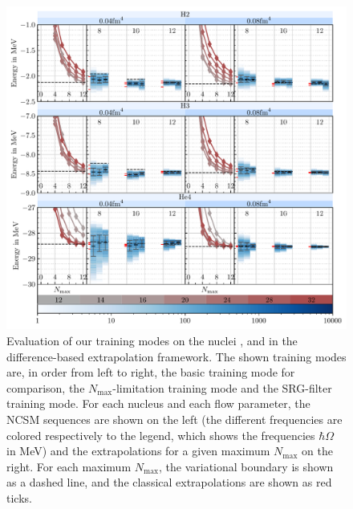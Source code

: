 \begin{figure}[H]
  \includegraphics[width=\textwidth]{media/diff_evaluation_ohne_fehlfit.pdf}
  \caption{Evaluation of our training modes on the nuclei ,  and  in the difference-based extrapolation framework. The shown training modes are, in order from left to right, the basic training mode for comparison, the $N_\mathrm{max}$-limitation training mode and the SRG-filter training mode. For each nucleus and each flow parameter, the NCSM sequences are shown on the left (the different frequencies are colored respectively to the legend, which shows the frequencies $\hbar\Omega$ in \si[]{\mega\electronvolt}) and the extrapolations for a given maximum $N_\mathrm{max}$ on the right. For each maximum $N_\mathrm{max}$, the variational boundary is shown as a dashed line, and the classical extrapolations are shown as red ticks.}
  \label{fig:eval_diff}
\end{figure}

